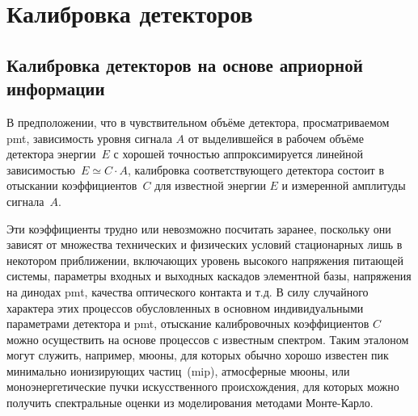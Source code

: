 \section{Калибровка детекторов}

\subsection{Калибровка детекторов на основе априорной информации}

В предположении, что в чувствительном объёме детектора,
просматриваемом \acrshort{pmt}, зависимость уровня сигнала $A$ от
выделившейся в рабочем объёме детектора энергии~$E$ с хорошей
точностью аппроксимируется линейной
зависимостью~$E \simeq C \cdot A$,
калибровка соответствующего детектора состоит в отыскании
коэффициентов~$C$ для известной энергии $E$ и измеренной амплитуды
сигнала~$A$.

Эти коэффициенты трудно или невозможно посчитать заранее, поскольку
они зависят от множества технических и физических условий стационарных
лишь в некотором приближении, включающих уровень высокого напряжения
питающей системы, параметры входных и выходных каскадов элементной
базы, напряжения на динодах \acrshort{pmt}, качества оптического контакта
и т.д.
В силу случайного характера этих процессов
обусловленных в основном индивидуальными параметрами детектора
и \acrshort{pmt}, отыскание калибровочных коэффициентов $C$
можно осуществить на основе процессов с известным спектром.
Таким эталоном могут служить, например, мюоны, для которых обычно
хорошо известен пик минимально ионизирующих частиц~(\acrshort{mip}),
атмосферные мюоны, или моноэнергетические пучки искусственного
происхождения, для которых можно получить спектральные
оценки из моделирования методами Монте-Карло.


